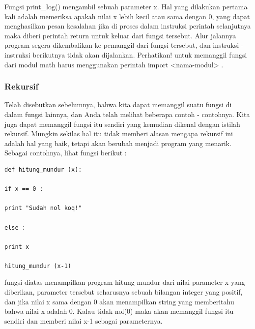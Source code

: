 Fungsi print\_log() mengambil sebuah parameter x. Hal yang dilakukan pertama kali adalah memeriksa apakah nilai x lebih kecil atau sama dengan 0, yang dapat menghasilkan pesan kesalahan jika di proses dalam instruksi perintah selanjutnya maka diberi perintah return untuk keluar dari fungsi tersebut. Alur jalannya program segera dikembalikan ke pemanggil dari fungsi tersebut, dan instruksi - instruksi berikutnya tidak akan dijalankan. Perhatikan! untuk memanggil fungsi dari modul math harus menggunakan perintah import <nama-modul> .

\subsubsection{Rekursif}

Telah disebutkan sebelumnya, bahwa kita dapat memanggil suatu fungsi di dalam fungsi lainnya, dan Anda telah melihat beberapa contoh - contohnya. Kita juga dapat memanggil fungsi itu sendiri yang kemudian dikenal dengan istilah rekursif. Mungkin sekilas hal itu tidak memberi alasan mengapa rekursif ini adalah hal yang baik, tetapi akan berubah menjadi program yang menarik. Sebagai contohnya, lihat 
fungsi berikut :

\begin{verbatim}
def hitung_mundur (x):

if x == 0 :

print "Sudah nol koq!"

else :

print x

hitung_mundur (x-1)
 \end{verbatim}
 
fungsi diatas menampilkan program hitung mundur dari nilai parameter x yang diberikan, parameter tersebut seharusnya sebuah bilangan integer yang positif, dan jika nilai x sama dengan 0 akan menampilkan string yang memberitahu bahwa nilai x adalah 0. Kalau tidak nol(0) maka akan memanggil fungsi itu sendiri dan memberi nilai x-1 sebagai parameternya.

